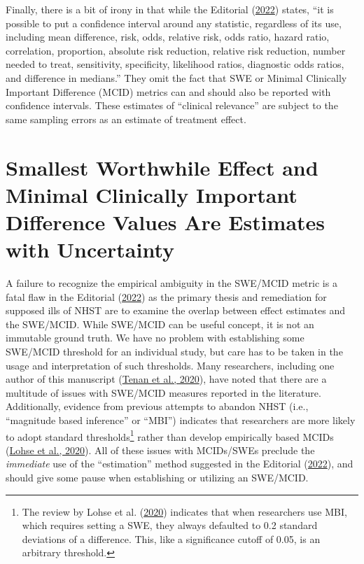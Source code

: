 \documentclass[]{cik}%
\begin{document}
Finally, there is a bit of irony in that while the Editorial
(\protect\hyperlink{ref-elkins2022}{2022}) states, ``it is possible to
put a confidence interval around any statistic, regardless of its use,
including mean difference, risk, odds, relative risk, odds ratio, hazard
ratio, correlation, proportion, absolute risk reduction, relative risk
reduction, number needed to treat, sensitivity, specificity, likelihood
ratios, diagnostic odds ratios, and difference in medians.'' They omit
the fact that SWE or Minimal Clinically Important Difference (MCID)
metrics can and should also be reported with confidence intervals. These
estimates of ``clinical relevance'' are subject to the same sampling
errors as an estimate of treatment effect.

\hypertarget{smallest-worthwhile-effect-and-minimal-clinically-important-difference-values-are-estimates-with-uncertainty}{%
\section{Smallest Worthwhile Effect and Minimal Clinically Important
Difference Values Are Estimates with
Uncertainty}\label{smallest-worthwhile-effect-and-minimal-clinically-important-difference-values-are-estimates-with-uncertainty}}

A failure to recognize the empirical ambiguity in the SWE/MCID metric is
a fatal flaw in the Editorial (\protect\hyperlink{ref-elkins2022}{2022})
as the primary thesis and remediation for supposed ills of NHST are to
examine the overlap between effect estimates and the SWE/MCID. While
SWE/MCID can be useful concept, it is not an immutable ground truth. We
have no problem with establishing some SWE/MCID threshold for an
individual study, but care has to be taken in the usage and
interpretation of such thresholds. Many researchers, including one
author of this manuscript (\protect\hyperlink{ref-tenan2020}{Tenan et
al., 2020}), have noted that there are a multitude of issues with
SWE/MCID measures reported in the literature. Additionally, evidence
from previous attempts to abandon NHST (i.e., ``magnitude based
inference'' or ``MBI'') indicates that researchers are more likely to
adopt standard thresholds\footnote{The review by Lohse et al.
  (\protect\hyperlink{ref-lohse2020systematic}{2020}) indicates that
  when researchers use MBI, which requires setting a SWE, they always
  defaulted to 0.2 standard deviations of a difference. This, like a
  significance cutoff of 0.05, is an arbitrary threshold.} rather than
develop empirically based MCIDs
(\protect\hyperlink{ref-lohse2020systematic}{Lohse et al., 2020}). All
of these issues with MCIDs/SWEs preclude the \emph{immediate} use of the
``estimation'' method suggested in the Editorial
(\protect\hyperlink{ref-elkins2022}{2022}), and should give some pause
when establishing or utilizing an SWE/MCID.
\end{document}
